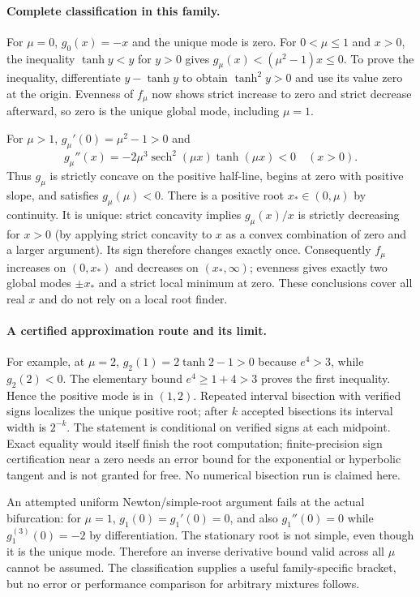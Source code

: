 \documentclass[11pt]{article}
\begin{document}
\paragraph{Complete classification in this family.}
For $\mu=0$, $g_0(x)=-x$ and the unique mode is zero.
For $0<\mu\le1$ and $x>0$, the inequality $\tanh y<y$ for $y>0$
gives $g_\mu(x)<(\mu^2-1)x\le0$.
To prove the inequality, differentiate $y-\tanh y$ to obtain
$\tanh^2y>0$ and use its value zero at the origin.
Evenness of $f_\mu$ now shows strict increase to zero and strict
decrease afterward, so zero is the unique global mode, including
$\mu=1$.

For $\mu>1$, $g_\mu'(0)=\mu^2-1>0$ and
\[
g_\mu''(x)=-2\mu^3\operatorname{sech}^2(\mu x)\tanh(\mu x)<0
\quad(x>0).
\]
Thus $g_\mu$ is strictly concave on the positive half-line, begins at
zero with positive slope, and satisfies $g_\mu(\mu)<0$.
There is a positive root $x_*\in(0,\mu)$ by continuity. It is unique:
strict concavity implies $g_\mu(x)/x$ is strictly decreasing for $x>0$
(by applying strict concavity to $x$ as a convex combination of zero
and a larger argument). Its sign therefore changes exactly once.
Consequently $f_\mu$ increases on $(0,x_*)$ and decreases on
$(x_*,\infty)$; evenness gives exactly two global modes $\pm x_*$
and a strict local minimum at zero. These conclusions cover all real
$x$ and do not rely on a local root finder.

\paragraph{A certified approximation route and its limit.}
For example, at $\mu=2$, $g_2(1)=2\tanh2-1>0$ because
$e^4>3$, while $g_2(2)<0$. The elementary bound $e^4\ge1+4>3$
proves the first inequality. Hence the positive mode is in $(1,2)$.
Repeated interval bisection with verified signs localizes the unique
positive root; after $k$ accepted bisections its interval width is
$2^{-k}$. The statement is conditional on verified signs at each
midpoint. Exact equality would itself finish the root computation;
finite-precision sign certification near a zero needs an error bound
for the exponential or hyperbolic tangent and is not granted for free.
No numerical bisection run is claimed here.

An attempted uniform Newton/simple-root argument fails at the actual
bifurcation: for $\mu=1$, $g_1(0)=g_1'(0)=0$, and also
$g_1''(0)=0$ while $g_1^{(3)}(0)=-2$ by differentiation. The stationary
root is not simple, even though it is the unique mode. Therefore an
inverse derivative bound valid across all $\mu$ cannot be assumed.
The classification supplies a useful family-specific bracket, but no
error or performance comparison for arbitrary mixtures follows.
\end{document}
